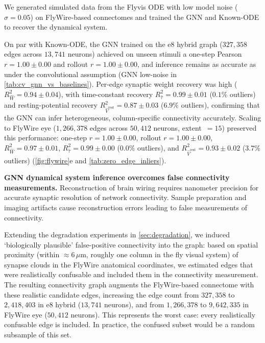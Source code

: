 \documentclass{article}
\begin{document}
We generated simulated data from the Flyvis ODE with low model noise ($\sigma=0.05$) on FlyWire-based connectomes and trained the GNN and Known-ODE to recover the dynamical system. 

On par with Known-ODE, the GNN trained on the e8 hybrid graph ($327{,}358$ edges across $13{,}741$ neurons) achieved on unseen stimuli a one-step Pearson $r = 1.00 \pm 0.00$ and rollout $r = 1.00 \pm 0.00$, and inference remains as accurate as under the convolutional assumption (GNN low-noise in \cref{tab:cv_gnn_vs_baselines}). Per-edge synaptic weight recovery was high ($R^2_{\hat{W}} = 0.94 \pm 0.04$), with time-constant recovery $R^2_{\hat{\tau}} = 0.99 \pm 0.01$ ($0.1\%$ outliers) and resting-potential recovery $R^2_{\hat{V}^{\mathrm{rest}}} = 0.87 \pm 0.03$ ($6.9\%$ outliers), confirming that the GNN can infer heterogeneous, column-specific connectivity accurately. Scaling to FlyWire eye ($1{,}266{,}378$ edges across $50{,}412$ neurons, extent~$=15$) preserved this performance: one-step $r = 1.00 \pm 0.00$, rollout $r = 1.00 \pm 0.00$, $R^2_{\hat{W}} = 0.97 \pm 0.01$, $R^2_{\hat{\tau}} = 0.99 \pm 0.00$ ($0.0\%$ outliers), and $R^2_{\hat{V}^{\mathrm{rest}}} = 0.93 \pm 0.02$ ($3.7\%$ outliers) (\cref{fig:flywire}e and \cref{tab:zero_edge_inliers}).

\textbf{GNN dynamical system inference overcomes false connectivity measurements.} Reconstruction of brain wiring requires nanometer precision for accurate synaptic resolution of network connectivity. Sample preparation and imaging artifacts cause reconstruction errors leading to false measurements of connectivity.

Extending the degradation experiments in \cref{sec:degradation}, we induced `biologically plausible' false-positive connectivity into the graph: based on spatial proximity (within $\approx\!6\,\mu$m, roughly one column in the fly visual system) of synapse clouds in the FlyWire anatomical coordinates, we estimated edges that were realistically confusable and included them in the connectivity measurement. The resulting connectivity graph augments the FlyWire-based connectome with these realistic candidate edges, increasing the edge count from $327{,}358$ to $2{,}418{,}403$ in e8 hybrid ($13{,}741$ neurons), and from $1{,}266{,}378$ to $9{,}642{,}335$ in FlyWire eye ($50{,}412$ neurons). This represents the worst case: every realistically confusable edge is included. In practice, the confused subset would be a random subsample of this set.
\end{document}
